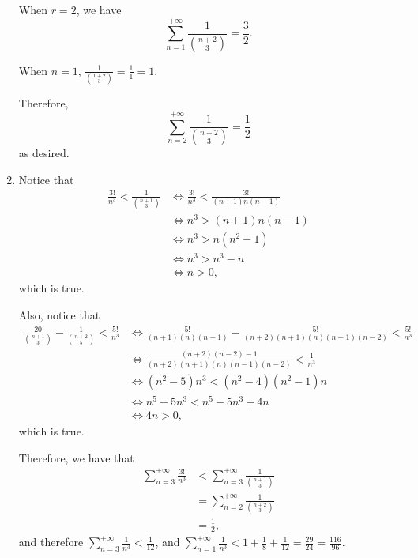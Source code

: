 \begin{enumerate}
          When \(r = 2\), we have
          \[
              \sum_{n = 1}^{+\infty} \frac{1}{\binom{n+2}{3}} = \frac{3}{2}.
          \]

          When \(n = 1\), \(\frac{1}{\binom{1 + 2}{3}} = \frac{1}{1} = 1\).

          Therefore,
          \[
              \sum_{n = 2}^{+\infty} \frac{1}{\binom{n+2}{3}} = \frac{1}{2}
          \]
          as desired.

    \item Notice that
          \begin{align*}
              \frac{3!}{n^3} < \frac{1}{\binom{n+1}{3}} & \iff \frac{3!}{n^3} < \frac{3!}{(n+1)n(n-1)} \\
                                                        & \iff n^3 > (n+1)n(n-1)                       \\
                                                        & \iff n^3 > n(n^2 - 1)                        \\
                                                        & \iff n^3 > n^3 - n                           \\
                                                        & \iff n > 0,
          \end{align*}
          which is true.

          Also, notice that
          \begin{align*}
              \frac{20}{\binom{n+1}{3}} - \frac{1}{\binom{n+2}{5}} < \frac{5!}{n^3} & \iff \frac{5!}{(n+1)(n)(n-1)} - \frac{5!}{(n+2)(n+1)(n)(n-1)(n-2)} < \frac{5!}{n^3} \\
                                                                                    & \iff \frac{(n+2)(n-2) - 1}{(n+2)(n+1)(n)(n-1)(n-2)} < \frac{1}{n^3}                 \\
                                                                                    & \iff (n^2 - 5)n^3 < (n^2 - 4)(n^2 - 1)n                                             \\
                                                                                    & \iff n^5 - 5n^3 < n^5 - 5n^3 + 4n                                                   \\
                                                                                    & \iff 4n > 0,
          \end{align*}
          which is true.

          Therefore, we have that
          \begin{align*}
              \sum_{n = 3}^{+\infty} \frac{3!}{n^3} & < \sum_{n = 3}^{+\infty} \frac{1}{\binom{n+1}{3}} \\
                                                    & = \sum_{n = 2}^{+\infty} \frac{1}{\binom{n+2}{3}} \\
                                                    & = \frac{1}{2},
          \end{align*}
          and therefore \(\sum_{n = 3}^{+\infty} \frac{1}{n^3} < \frac{1}{12}\), and \(\sum_{n = 1}^{+\infty} \frac{1}{n^3} < 1 + \frac{1}{8} + \frac{1}{12} = \frac{29}{24} = \frac{116}{96}.\)


\end{enumerate}
